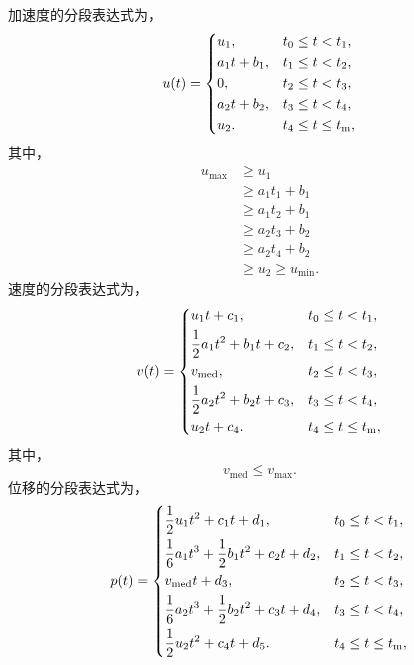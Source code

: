 加速度的分段表达式为，
\begin{equation}
u(t)=
\begin{dcases}
u_1,\quad & t_0\leq t<t_1,\\
a_1t+b_1, & t_1\leq t<t_2,\\
0, & t_2\leq t<t_3,\\
a_2t+b_2,& t_3\leq t<t_4,\\
u_2. & t_4\leq t\leq t_\mathrm{m},\\
\end{dcases}
\end{equation}
其中，
\begin{equation}
\begin{split}
u_{\max}&\geq u_1\\
&\geq a_1t_1+b_1\\
&\geq a_1t_2+b_1\\
&\geq a_2t_3+b_2\\
&\geq a_2t_4+b_2\\
&\geq u_2 \geq u_{\min}.
\end{split}
\label{eq:num:aac}
\end{equation}
速度的分段表达式为，
\begin{equation}
v(t)=
\begin{dcases}
u_1t+c_1,\quad & t_0\leq t<t_1,\\
\frac12a_1t^2+b_1t+c_2, & t_1\leq t<t_2,\\
v_\mathrm{med}, & t_2\leq t<t_3,\\
\frac12a_2t^2+b_2t+c_3,& t_3\leq t<t_4,\\
u_2t+c_4. & t_4\leq t\leq t_\mathrm{m},\\
\end{dcases}
\end{equation}
其中，
\begin{equation}
v_\mathrm{med}\leq v_{\max}.
\label{eq:num:vvc}
\end{equation}
位移的分段表达式为，
\begin{equation}
p(t)=
\begin{dcases}
\frac12u_1t^2+c_1t+d_1,\quad & t_0\leq t<t_1,\\
\frac16a_1t^3+\frac12b_1t^2+c_2t+d_2, & t_1\leq t<t_2,\\
v_\mathrm{med}t+d_3, & t_2\leq t<t_3,\\
\frac16a_2t^3+\frac12b_2t^2+c_3t+d_4,& t_3\leq t<t_4,\\
\frac12u_2t^2+c_4t+d_5. & t_4\leq t\leq t_\mathrm{m},\\
\end{dcases}
\end{equation}
